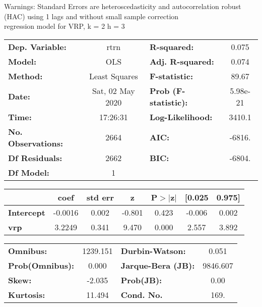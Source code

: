 Warnings: \newline
 [1] Standard Errors are heteroscedasticity and autocorrelation robust (HAC) using 1 lags and without small sample correction\\ 

regression model for VRP, k = 2 h = 3\begin{center}
\begin{tabular}{lclc}
\toprule
\textbf{Dep. Variable:}    &       rtrn       & \textbf{  R-squared:         } &     0.075   \\
\textbf{Model:}            &       OLS        & \textbf{  Adj. R-squared:    } &     0.074   \\
\textbf{Method:}           &  Least Squares   & \textbf{  F-statistic:       } &     89.67   \\
\textbf{Date:}             & Sat, 02 May 2020 & \textbf{  Prob (F-statistic):} &  5.98e-21   \\
\textbf{Time:}             &     17:26:31     & \textbf{  Log-Likelihood:    } &    3410.1   \\
\textbf{No. Observations:} &        2664      & \textbf{  AIC:               } &    -6816.   \\
\textbf{Df Residuals:}     &        2662      & \textbf{  BIC:               } &    -6804.   \\
\textbf{Df Model:}         &           1      & \textbf{                     } &             \\
\bottomrule
\end{tabular}
\begin{tabular}{lcccccc}
                   & \textbf{coef} & \textbf{std err} & \textbf{z} & \textbf{P$> |$z$|$} & \textbf{[0.025} & \textbf{0.975]}  \\
\midrule
\textbf{Intercept} &      -0.0016  &        0.002     &    -0.801  &         0.423        &       -0.006    &        0.002     \\
\textbf{vrp}       &       3.2249  &        0.341     &     9.470  &         0.000        &        2.557    &        3.892     \\
\bottomrule
\end{tabular}
\begin{tabular}{lclc}
\textbf{Omnibus:}       & 1239.151 & \textbf{  Durbin-Watson:     } &    0.051  \\
\textbf{Prob(Omnibus):} &   0.000  & \textbf{  Jarque-Bera (JB):  } & 9846.607  \\
\textbf{Skew:}          &  -2.035  & \textbf{  Prob(JB):          } &     0.00  \\
\textbf{Kurtosis:}      &  11.494  & \textbf{  Cond. No.          } &     169.  \\
\bottomrule
\end{tabular}
\end{center}

